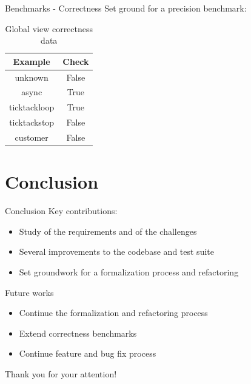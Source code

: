 \documentclass{beamer}
\begin{document}
\begin{frame}{Benchmarks - Correctness}
Set ground for a precision benchmark:

\begin{table}[!ht]
\centering
\begin{tabular}{|c|c|}
\hline
Example & Check \\ 
\hline
unknown & False \\ 
async & True \\ 
ticktackloop & True \\ 
ticktackstop & False \\ 
customer & False \\ 
\hline
\end{tabular}
\caption{Global view correctness data}
\label{tab:corrbench}
\end{table}
\end{frame}


\section{Conclusion}
\begin{frame}{Conclusion}
Key contributions:
\bigskip
\begin{itemize}
    \item Study of the requirements and of the challenges
    \bigskip
    \item Several improvements to the codebase and test suite
    \bigskip
    \item Set groundwork for a formalization process and refactoring
\end{itemize}

\end{frame}


\begin{frame}{Future works}
\begin{itemize}
    \item Continue the formalization and refactoring process
    \bigskip
    \item Extend correctness benchmarks
    \bigskip
    \item Continue feature and bug fix process
\end{itemize}
\end{frame}


\begin{frame}{}
\centering
Thank you for your attention!
\end{frame}
\end{document}
